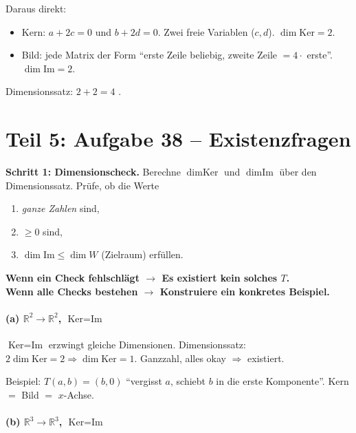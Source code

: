 \documentclass[a4paper,12pt]{article}
\begin{document}
Daraus direkt:
\begin{itemize}[nosep]
    \item Kern: $a + 2c = 0$ und $b + 2d = 0$. Zwei freie Variablen ($c, d$). $\dim \text{Ker} = 2$.
    \item Bild: jede Matrix der Form ``erste Zeile beliebig, zweite Zeile $= 4 \cdot$ erste''. $\dim \text{Im} = 2$.
\end{itemize}

Dimensionssatz: $2 + 2 = 4$ \checkmark.

\newpage

\part*{Teil 5: Aufgabe 38 -- Existenzfragen}

\begin{merkbox}[title={Hauptwerkzeug f\"ur Existenzaufgaben}]
\textbf{Schritt 1: Dimensionscheck.} Berechne $\dim \text{Ker}$ und $\dim \text{Im}$ \"uber den Dimensionssatz. Pr\"ufe, ob die Werte
\begin{enumerate}[nosep]
    \item \emph{ganze Zahlen} sind,
    \item $\geq 0$ sind,
    \item $\dim \text{Im} \leq \dim W$ (Zielraum) erf\"ullen.
\end{enumerate}
\textbf{Wenn ein Check fehlschl\"agt $\to$ Es existiert kein solches $T$.} \\
\textbf{Wenn alle Checks bestehen $\to$ Konstruiere ein konkretes Beispiel.}
\end{merkbox}

\subsection*{(a) $\mathbb{R}^2 \to \mathbb{R}^2$, $\text{Ker} = \text{Im}$}

$\text{Ker} = \text{Im}$ erzwingt gleiche Dimensionen. Dimensionssatz: $2 \dim \text{Ker} = 2 \Rightarrow \dim \text{Ker} = 1$. Ganzzahl, alles okay $\Rightarrow$ existiert.

Beispiel: $T(a, b) = (b, 0)$ ``vergisst $a$, schiebt $b$ in die erste Komponente''. Kern $=$ Bild $=$ $x$-Achse.

\subsection*{(b) $\mathbb{R}^3 \to \mathbb{R}^3$, $\text{Ker} = \text{Im}$}
\end{document}
